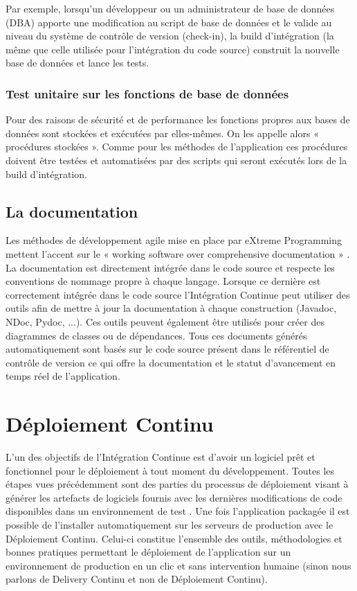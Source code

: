     Par exemple, lorsqu’un développeur ou un administrateur de base de données (DBA) apporte une modification au script de base de données et le valide au niveau du système de contrôle de version (check-in), la build d’intégration (la même que celle utilisée pour l’intégration du code source) construit la nouvelle base de données et lance les tests.

      \subsubsection{Test unitaire sur les fonctions de base de données}
      Pour des raisons de sécurité et de performance les fonctions propres aux bases de données sont stockées et exécutées par elles-mêmes. On les appelle alors « procédures stockées ». Comme pour les méthodes de l’application ces procédures doivent être testées et automatisées par des scripts qui seront exécutés lors de la build d’intégration.

    \subsection{La documentation}
    Les méthodes de développement agile mise en place par eXtreme Programming mettent l'accent sur le « working software over comprehensive documentation » \cite{HF01}. La documentation est directement intégrée dans le code source et respecte les conventions de nommage propre à chaque langage. Lorsque ce dernière est correctement intégrée dans le code source l'Intégration Continue peut utiliser des outils afin de mettre à jour la documentation à chaque construction (Javadoc, NDoc, Pydoc, ...). Ces outils peuvent également être utilisés pour créer des diagrammes de classes ou de dépendances. Tous ces documents générés automatiquement sont basés sur le code source présent dans le référentiel de contrôle de version ce qui offre la documentation et le statut d'avancement en temps réel de l'application.

  \section{Déploiement Continu}
  L'un des objectifs de l’Intégration Continue est d'avoir un logiciel prêt et fonctionnel pour le déploiement à tout moment du développement. Toutes les étapes vues précédemment sont des parties du processus de déploiement visant à générer les artefacts de logiciels fournis avec les dernières modifications de code disponibles dans un environnement de test \cite{Duv07}. Une fois l’application packagée il est possible de l'installer automatiquement sur les serveurs de production avec le Déploiement Continu. Celui-ci constitue l'ensemble des outils, méthodologies et bonnes pratiques permettant le déploiement de l'application sur un environnement de production en un clic et sans intervention humaine (sinon nous parlons de Delivery Continu et non de Déploiement Continu).

